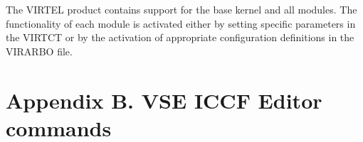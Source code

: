 \documentclass[letterpaper,10pt,english]{sphinxmanual}
\begin{document}
The VIRTEL product contains support for the base kernel and all modules. The functionality of each module is activated either by setting specific parameters in the VIRTCT or by the activation of appropriate configuration definitions in the VIRARBO file.

\begin{DUlineblock}{0em}
\item[] 
\end{DUlineblock}

\newpage


\section{Appendix B. VSE ICCF Editor commands}
\label{\detokenize{Installation_Guide:appendix-b-vse-iccf-editor-commands}}

\begin{sphinxVerbatim}[commandchars=\\\{\}]
                      
                       
                       
                        
                      
                      
                       
\end{sphinxVerbatim}


\begin{sphinxVerbatim}[commandchars=\\\{\}]
          
         
\end{sphinxVerbatim}


\begin{sphinxVerbatim}[commandchars=\\\{\}]
         
\end{sphinxVerbatim}
\end{document}
